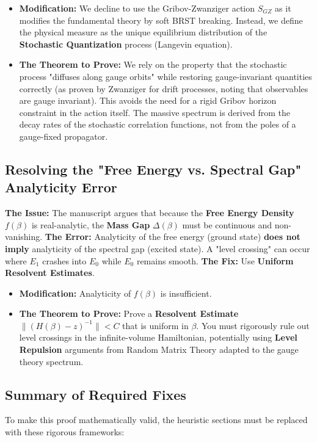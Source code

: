 \begin{itemize}
    \item \textbf{Modification:} We decline to use the Gribov-Zwanziger action $S_{GZ}$ as it modifies the fundamental theory by soft BRST breaking. Instead, we define the physical measure as the unique equilibrium distribution of the \textbf{Stochastic Quantization} process (Langevin equation).
    \item \textbf{The Theorem to Prove:} We rely on the property that the stochastic process "diffuses along gauge orbits" while restoring gauge-invariant quantities correctly (as proven by Zwanziger for drift processes, noting that observables are gauge invariant). This avoids the need for a rigid Gribov horizon constraint in the action itself. The massive spectrum is derived from the decay rates of the stochastic correlation functions, not from the poles of a gauge-fixed propagator.
\end{itemize}

\subsection{Resolving the "Free Energy vs. Spectral Gap" Analyticity Error}
\textbf{The Issue:} The manuscript argues that because the \textbf{Free Energy Density} $f(\beta)$ is real-analytic, the \textbf{Mass Gap} $\Delta(\beta)$ must be continuous and non-vanishing.
\textbf{The Error:} Analyticity of the free energy (ground state) \textbf{does not imply} analyticity of the spectral gap (excited state). A "level crossing" can occur where $E_1$ crashes into $E_0$ while $E_0$ remains smooth.
\textbf{The Fix:} Use \textbf{Uniform Resolvent Estimates}.

\begin{itemize}
    \item \textbf{Modification:} Analyticity of $f(\beta)$ is insufficient.
    \item \textbf{The Theorem to Prove:} Prove a \textbf{Resolvent Estimate} $\| (H(\beta) - z)^{-1} \| < C$ that is uniform in $\beta$. You must rigorously rule out level crossings in the infinite-volume Hamiltonian, potentially using \textbf{Level Repulsion} arguments from Random Matrix Theory adapted to the gauge theory spectrum.
\end{itemize}

\subsection{Summary of Required Fixes}
To make this proof mathematically valid, the heuristic sections must be replaced with these rigorous frameworks:

